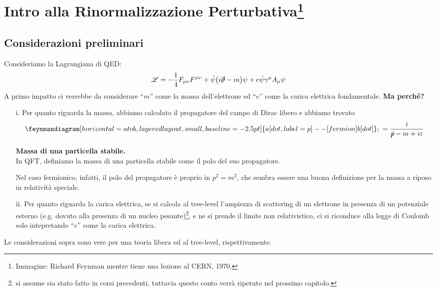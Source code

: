 \documentclass[../main.tex]{subfiles}
\begin{document}
\setchapterpreamble[u]{\margintoc}
\chapter[Intro alla Rinormalizzazione Perturbativa]{Intro alla Rinormalizzazione Perturbativa\footnote{Immagine: Richard Feynman mentre tiene una lezione al CERN, 1970.}}
\fboxsep =1pt %

\section{Considerazioni preliminari}
Consideriamo la Lagrangiana di QED:
\begin{equation}
    \mathscr{L} = -\frac{1}{4} F_{\mu\nu}F^{\mu\nu} + \Bar{\psi}\bigl(i\slashed\partial-m\bigr)\psi + e \Bar{\psi}\gamma^\mu A_\mu\psi
    \label{eq:QED_lagrangian}
\end{equation}
A primo impatto ci verrebbe da considerare “$m$” come la massa dell'elettrone ed “$e$” come la carica elettrica fondamentale. \textbf{Ma perché?}
\begin{enumerate}
    \item[i.] Per quanto riguarda la massa, abbiamo calcolato il propagatore del campo di Dirac libero e abbiamo trovato 
    \[
    \feynmandiagram[horizontal=a to b, layered layout, small, baseline=\plusheight] {
                                        a[dot, label={p}]  -- [fermion] b[dot]
                                        };
    ~ = \frac{i}{\slashed p - m+i\varepsilon}
    \]
    \begin{definition}
    \textbf{Massa di una particella stabile.}\\
    In QFT, definiamo la massa di una particella stabile come il polo del suo propagatore.
    \label{def:particle_mass}
    \end{definition}
    Nel caso fermionico, infatti, il polo del propagatore è proprio in $p^2=m^2$, che sembra essere una buona definizione per la massa a riposo in relatività speciale. 
    
    \item[ii.]Per quanto riguarda la carica elettrica, se si calcola al tree-level l'ampiezza di scattering di un elettrone in presenza di un potenziale esterno (e.g. dovuto alla presenza di un nucleo pesante)\footnote{si assume sia stato fatto in corsi precedenti, tuttavia questo conto verrà ripetuto nel prossimo capitolo.}, e ne si prende il limite non relativistico, ci si riconduce alla legge di Coulomb solo intepretando “$e$” come la carica elettrica.
\end{enumerate}
Le considerazioni sopra sono vere per una teoria libera ed al tree-level, rispettivamente.
\end{document}
